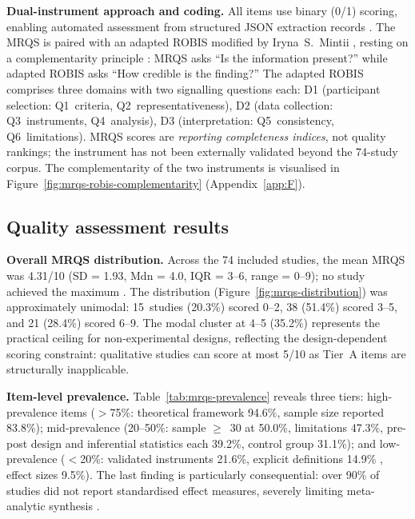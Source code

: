 

\textbf{Dual-instrument approach and coding.} \label{sec:dual-instrument} All items use binary (0/1) scoring, enabling automated assessment from structured JSON extraction records \cite{KorniienkoSemerikov2024, MarquesCruz2025}. The MRQS is paired with an adapted ROBIS \cite{Whiting2016} modified by Iryna~S.~Mintii \cite{KorniienkoSemerikov2024}, resting on a complementarity principle \cite{PerryWhitmarsh2021}: MRQS asks ``Is the information present?'' while adapted ROBIS asks ``How credible is the finding?'' The adapted ROBIS comprises three domains with two signalling questions each: D1 (participant selection: Q1~criteria, Q2~representativeness), D2 (data collection: Q3~instruments, Q4~analysis), D3 (interpretation: Q5~consistency, Q6~limitations). MRQS scores are \emph{reporting completeness indices}, not quality rankings; the instrument has not been externally validated beyond the 74-study corpus. The complementarity of the two instruments is visualised in Figure~\ref{fig:mrqs-robis-complementarity} (Appendix~\ref{app:F}).

\subsection{Quality assessment results} \label{sec:qa-results}

\textbf{Overall MRQS distribution.} \label{sec:mrqs-distribution} Across the 74 included studies, the mean MRQS was 4.31/10 (SD = 1.93, Mdn = 4.0, IQR = 3--6, range = 0--9); no study achieved the maximum \cite{Korniienko2025mrqs}. The distribution (Figure~\ref{fig:mrqs-distribution}) was approximately unimodal: 15~studies (20.3\%) scored 0--2, 38 (51.4\%) scored 3--5, and 21 (28.4\%) scored 6--9. The modal cluster at 4--5 (35.2\%) represents the practical ceiling for non-experimental designs, reflecting the design-dependent scoring constraint: qualitative studies can score at most 5/10 as Tier~A items are structurally inapplicable.



\textbf{Item-level prevalence.} \label{sec:item-prevalence} Table~\ref{tab:mrqs-prevalence} reveals three tiers: high-prevalence items ($>$75\%: theoretical framework 94.6\%, sample size reported 83.8\%); mid-prevalence (20--50\%: sample $\geq$~30 at 50.0\%, limitations 47.3\%, pre-post design and inferential statistics each 39.2\%, control group 31.1\%); and low-prevalence ($<$20\%: validated instruments 21.6\%, explicit definitions 14.9\% \cite{30Zin2008, 23Zin2009322, 43ali2021indonesian, 34Serrano2023, 42Huffer201581, 41Petersen2023301, 58Shih2015173, 36Scholz2021, 37Lewis202054, 76Corbeil2011462, 65Razak201139}, effect sizes 9.5\%). The last finding is particularly consequential: over 90\% of studies did not report standardised effect measures, severely limiting meta-analytic synthesis \cite{Borenstein2009, Higgins2011, Tamim2011}.

